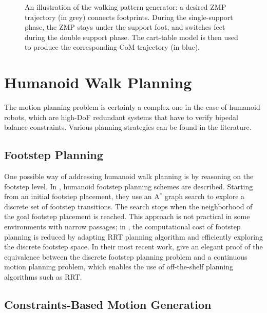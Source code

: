 \begin{figure}
  \centering
  
  \caption{An illustration of the walking pattern generator: a desired
    ZMP trajectory (in grey) connects footprints. During the
    single-support phase, the ZMP stays under the support foot, and
    switches feet during the double support phase. The cart-table
    model is then used to produce the corresponding CoM trajectory (in
    blue).}
  \label{fig:chap1-zmp}
\end{figure}

\section{Humanoid Walk Planning}
\label{sec:chap1-humanoid-walk-planning}

The motion planning problem is certainly a complex one in the case of
humanoid robots, which are high-DoF redundant systems that have to
verify bipedal balance constraints. Various planning strategies can
be found in the literature.

\subsection{Footstep Planning}
\label{subsec:chap1-footstep-planning}

One possible way of addressing humanoid walk planning is by reasoning
on the footstep level. In \cite{kuff01,ches05}, humanoid footstep
planning schemes are described. Starting from an initial footstep
placement, they use an A$^{*}$ graph search \cite{hart68} to explore a
discrete set of footstep transitions. The search stops when the
neighborhood of the goal footstep placement is reached. This approach
is not practical in some environments with narrow passages; in
\cite{xia09, perr11a}, the computational cost of footstep planning is
reduced by adapting RRT planning algorithm and efficiently exploring
the discrete footstep space. In their most recent work, \cite{perr11b,
  perr12} give an elegant proof of the equivalence between the
discrete footstep planning problem and a continuous motion planning
problem, which enables the use of off-the-shelf planning algorithms
such as RRT.

\subsection{Constraints-Based Motion Generation}
\label{subsec:chap1-constraints-motion-generation}

